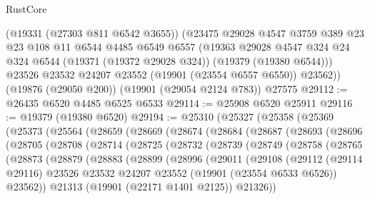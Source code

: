 \begin{lexlean}{RustCore}
\begin{coremodule}
      (@19331 (@27303 @811 @6542 @3655))
      (@23475
        @29028
        @4547
        @3759
        @389
        @23
        @23
        @108
        @11
        @6544
        @4485
        @6549
        @6557
        (@19363
          @29028
          @4547
          @324
          @24
          @324
          @6544
          (@19371 (@19372 @29028 @324))
          (@19379 (@19380 @6544)))
        @23526
        @23532
        @24207
        @23552
        (@19901 (@23554 @6557 @6550))
        @23562))
    (@19876 (@29050 @200))
    (@19901 (@29054 @2124 @783))
    @27575
@29112 := @26435 @6520 @4485 @6525 @6533
@29114 := @25908 @6520 @25911
@29116 := @19379 (@19380 @6520)
@29194 := @25310
    (@25327
      (@25358
        (@25369
          (@25373
            (@25564
              (@28659
                (@28669
                  (@28674
                    (@28684
                      (@28687
                        (@28693
                          (@28696
                            (@28705
                              (@28708
                                (@28714
                                  (@28725
                                    (@28732
                                      (@28739
                                        (@28749
                                          (@28758
                                            (@28765
                                              (@28873
                                                (@28879
                                                  (@28883
                                                    (@28899
                                                      (@28996
                                                        (@29011
                                                          (@29108
                                                            (@29112
                                                              (@29114 @29116)
                                                              @23526
                                                              @23532
                                                              @24207
                                                              @23552
                                                              (@19901 (@23554 @6533 @6526))
                                                              @23562))
                                                          @21313
                                                          (@19901 (@22171 @1401 @2125))
                                                          @21326))

\end{coremodule}
\end{lexlean}
